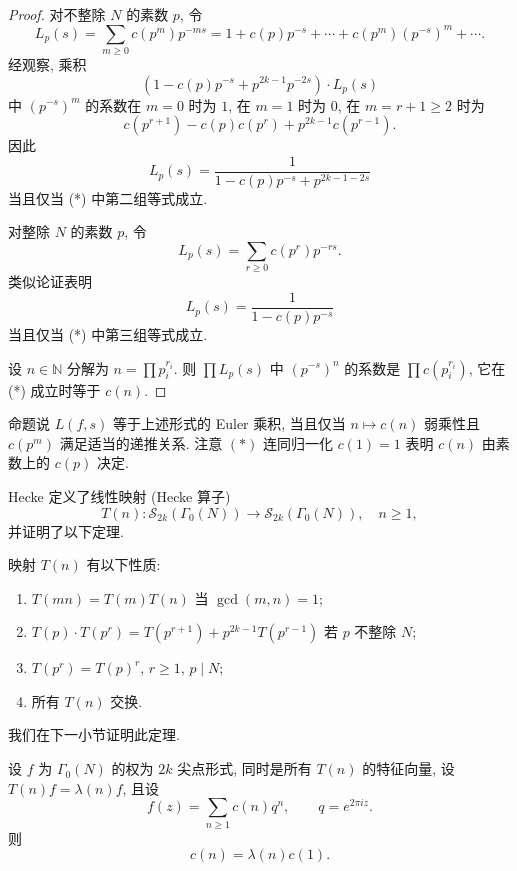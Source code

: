 \begin{proof}
对不整除 $N$ 的素数 $p$, 令
\[
L_p(s) = \sum_{m\ge 0}c(p^m)p^{-ms} = 1 + c(p)p^{-s} + \cdots + c(p^m)(p^{-s})^m + \cdots.
\]
经观察, 乘积
\[
(1 - c(p)p^{-s} + p^{2k-1}p^{-2s})\cdot L_p(s)
\]
中 $(p^{-s})^m$ 的系数在 $m = 0$ 时为 $1$, 在 $m = 1$ 时为 $0$, 在 $m = r+1\ge 2$ 时为
\[
c(p^{r+1}) - c(p)c(p^r) + p^{2k-1}c(p^{r-1}).
\]
因此
\[
L_p(s) = \frac{1}{1-c(p)p^{-s} + p^{2k-1-2s}}
\]
当且仅当 (*) 中第二组等式成立.

对整除 $N$ 的素数 $p$, 令
\[
L_p(s) = \sum_{r\ge 0}c(p^r)p^{-rs}.
\]
类似论证表明
\[
L_p(s) = \frac{1}{1-c(p)p^{-s}}
\]
当且仅当 (*) 中第三组等式成立.

设 $n\in\mathbb{N}$ 分解为 $n = \prod p_i^{r_i}$. 则 $\prod L_p(s)$ 中 $(p^{-s})^n$ 的系数是 $\prod c(p_i^{r_i})$, 它在 (*) 成立时等于 $c(n)$.
\end{proof}

\begin{remark} \label{thm:5.4.6}
命题说 $L(f, s)$ 等于上述形式的 Euler 乘积, 当且仅当 $n\mapsto c(n)$ 弱乘性且 $c(p^m)$ 满足适当的递推关系. 注意 $(*)$ 连同归一化 $c(1) = 1$ 表明 $c(n)$ 由素数上的 $c(p)$ 决定.
\end{remark}

Hecke 定义了线性映射 (Hecke 算子)
\[
T(n)\colon \mathcal{S}_{2k}(\Gamma_0(N))\to\mathcal{S}_{2k}(\Gamma_0(N)), \quad n\ge 1,
\]
并证明了以下定理.

\begin{theorem} \label{thm:5.4.7}
映射 $T(n)$ 有以下性质:
\begin{enumerate}[label=\textup{(\alph*)}]
\item $T(mn) = T(m)T(n)$ 当 $\gcd(m, n) = 1$;
\item $T(p)\cdot T(p^r) = T(p^{r+1}) + p^{2k-1}T(p^{r-1})$ 若 $p$ 不整除 $N$;
\item $T(p^r) = T(p)^r$, $r\ge 1$, $p\mid N$;
\item 所有 $T(n)$ 交换.
\end{enumerate}
\end{theorem}

我们在下一小节证明此定理.

\begin{theorem} \label{thm:5.4.8}
设 $f$ 为 $\Gamma_0(N)$ 的权为 $2k$ 尖点形式, 同时是所有 $T(n)$ 的特征向量, 设 $T(n)f = \lambda(n)f$, 且设
\[
f(z) = \sum_{n\ge 1}c(n)q^n, \qquad q = e^{2\pi iz}.
\]
则
\[
c(n) = \lambda(n)c(1).
\]
\end{theorem}

